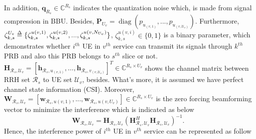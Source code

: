 \documentclass[conference]{IEEEtran}
\def\delequal{\mathrel{\ensurestackMath{\stackon[1pt]{=}{\scriptstyle\Delta}}}}
\newcommand{\diag}{\mathop{\mathrm{diag}}}
\begin{document}
In addition, $\boldsymbol{q}_{R_s} \in \mathbb{C}^{{R}_s }  $ indicates the quantization noise which, is made from signal compression in BBU.
Besides, $\boldsymbol{P}_{U_v} = \diag{(p_{u_{(v,1)}}, ..., p_{u_{(v,\mathcal{U}_v)}})}$.
\newline
Furthermore, $\zeta_{k,s}^{U_v} \delequal \{\zeta_{k,s}^{u(v,1)},\zeta_{k,s}^{u(v,2)},...,\zeta_{k,s}^{u(v,N_{U_v})}\}$,
$\zeta_{k,s}^{u(v,i)} \in \{0,1\}$ is a binary parameter, which demonstrates whether $i^{th}$ UE in $v^{th}$ service can transmit its signals through $k^{th}$ PRB and also this PRB belongs to $s^{th}$ slice or not.
$\boldsymbol{H}_{\mathcal{R}_s,\mathcal{U}_v}=\left[\boldsymbol{h}_{\mathcal{R}_s,u_{(v,1)}},\ldots,\boldsymbol{h}_{\mathcal{R}_s,v_{(v,\mathcal{U}_v)}}\right]^T  \in \mathbb{C}^{{R}_s\times {U}_v }$ 
shows the channel matrix between RRH set $\mathcal{R}_s$ to UE set
$\mathcal{U}_v$, besides. 
What's more, it is assumed we have perfect channel state information (CSI).\newline
Moreover, $\boldsymbol{W}_{\mathcal{R}_s,\mathcal{U}_v} = [\boldsymbol{w}_{\mathcal{R}_s,u(v,1)},...,\boldsymbol{w}_{\mathcal{R}_s,u(v,U_v)}] \in \mathbb{C}^{{R}_s\times U_v} $ is the zero forcing beamforming vector to minimize the interference which is indicated as below
\begin{equation}
\boldsymbol{W}_{\mathcal{R}_s,\mathcal{U}_v} = \boldsymbol{H}_{\mathcal{R}_s,\mathcal{U}_v}(\boldsymbol{H}_{\mathcal{R}_s,\mathcal{U}_v}^H \boldsymbol{H}_{\mathcal{R}_s,\mathcal{U}_v})^{-1}.
\end{equation}
Hence, the interference power of $i^{th}$ UE in $v^{th}$ service can be represented as follow
\end{document}
